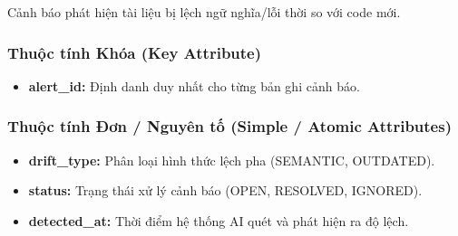 Cảnh báo phát hiện tài liệu bị lệch ngữ nghĩa/lỗi thời so với code mới.

\subsubsection{Thuộc tính Khóa (Key Attribute)}

\begin{itemize}
    \item \textbf{alert\_id:} Định danh duy nhất cho từng bản ghi cảnh báo.
\end{itemize}

\subsubsection{Thuộc tính Đơn / Nguyên tố (Simple / Atomic Attributes)}

\begin{itemize}
    \item \textbf{drift\_type:} Phân loại hình thức lệch pha (SEMANTIC, OUTDATED).
    \item \textbf{status:} Trạng thái xử lý cảnh báo (OPEN, RESOLVED, IGNORED).
    \item \textbf{detected\_at:} Thời điểm hệ thống AI quét và phát hiện ra độ lệch.
\end{itemize}